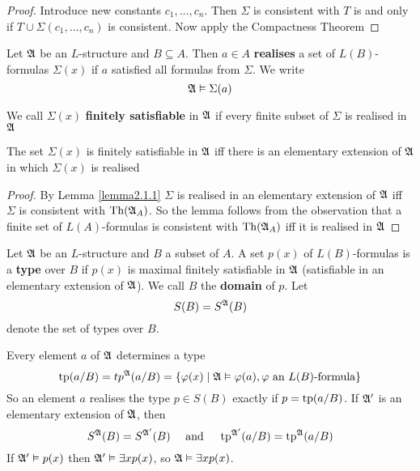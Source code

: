 \documentclass[11pt]{article}
\begin{document}
\begin{proof}
Introduce new constants \(c_1,\dots,c_n\). Then \(\Sigma\) is consistent with \(T\) is
and only if \(T\cup\Sigma(c_1,\dots,c_n)\) is consistent. Now apply the
Compactness Theorem
\end{proof}

\begin{definition}[]
Let \(\mathfrak{A}\) be an \(L\)-structure and \(B\subseteq A\). Then \(a\in A\)
\textbf{realises} a set of \(L(B)\)-formulas \(\Sigma(x)\) if \(a\) satisfied all formulas
from \(\Sigma\). We write 
\begin{equation*}
\mathfrak{A}\vDash\Sigma(a)
\end{equation*}

We call \(\Sigma(x)\) \textbf{finitely satisfiable} in \(\mathfrak{A}\) if every finite subset of \(\Sigma\)
is realised in \(\mathfrak{A}\)
\end{definition}

\begin{lemma}[]
\label{lemma2.2.7}
The set \(\Sigma(x)\) is finitely satisfiable in \(\mathfrak{A}\) iff there is an
elementary extension of \(\mathfrak{A}\) in which \(\Sigma(x)\) is realised
\end{lemma}

\begin{proof}
By Lemma \ref{lemma2.1.1} \(\Sigma\) is realised in an elementary extension of \(\mathfrak{A}\)
iff \(\Sigma\) is consistent with \(\operatorname{Th}(\mathfrak{A}_A)\). So the lemma follows from the
observation that a finite set of \(L(A)\)-formulas is consistent with
\(\operatorname{Th}(\mathfrak{A}_A)\) iff it is realised in \(\mathfrak{A}\)
\end{proof}

\begin{definition}[]
Let \(\mathfrak{A}\) be an \(L\)-structure and \(B\) a subset of \(A\). A set \(p(x)\)
of \(L(B)\)-formulas is a \textbf{type} over \(B\) if \(p(x)\) is maximal finitely
satisfiable in \(\mathfrak{A}\) (satisfiable in an elementary extension of \(\mathfrak{A}\)). We call \(B\) the \textbf{domain} of \(p\). Let
\begin{equation*}
S(B)=S^{\mathfrak{A}}(B)
\end{equation*}
denote the set of types over \(B\).
\end{definition}

Every element \(a\) of \(\mathfrak{A}\) determines a type
\begin{equation*}
\operatorname{tp}(a/B)=tp^{\mathfrak{A}}(a/B)=\{\varphi(x)\mid\mathfrak{A}\vDash\varphi(a),\varphi\text{ an $L(B)$-formula}\}
\end{equation*}
So an element \(a\) realises the type \(p\in S(B)\) exactly if
\(p=\operatorname{tp}(a/B)\). If \(\mathfrak{A}'\) is an elementary extension of \(\mathfrak{A}\), then
\begin{equation*}
S^{\mathfrak{A}}(B)=S^{\mathfrak{A}'}(B)\quad\text{ and }\quad
\operatorname{tp}^{\mathfrak{A}'}(a/B)=\operatorname{tp}^{\mathfrak{A}}(a/B)
\end{equation*}
If \(\mathfrak{A}'\vDash p(x)\) then \(\mathfrak{A}'\vDash\exists xp(x)\), so
\(\mathfrak{A}\vDash\exists xp(x)\).
\end{document}
